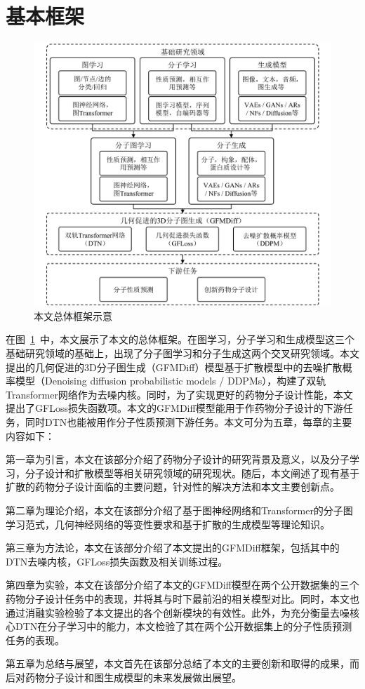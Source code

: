 \section{基本框架}
\begin{figure}[h]
    \centering
    \includegraphics[width=\linewidth]{figures/overall_structure.png}
    \caption{本文总体框架示意}
    \label{fig:oa_struc}
  \end{figure}

在图~\ref{fig:oa_struc}~中，本文展示了本文的总体框架。在图学习，分子学习和生成模型这三个基础研究领域的基础上，出现了分子图学习和分子生成这两个交叉研究领域。本文提出的几何促进的3D分子图生成（GFMDiff）模型基于扩散模型中的去噪扩散概率模型（Denoising diffusion probabilistic models / DDPMs），构建了双轨Transformer网络作为去噪内核。同时，为了实现更好的药物分子设计性能，本文提出了GFLoss损失函数项。本文的GFMDiff模型能用于作药物分子设计的下游任务，同时DTN也能被用作分子性质预测下游任务。本文可分为五章，每章的主要内容如下：

第一章为引言，本文在该部分介绍了药物分子设计的研究背景及意义，以及分子学习，分子设计和扩散模型等相关研究领域的研究现状。随后，本文阐述了现有基于扩散的药物分子设计面临的主要问题，针对性的解决方法和本文主要创新点。

第二章为理论介绍，本文在该部分介绍了基于图神经网络和Transformer的分子图学习范式，几何神经网络的等变性要求和基于扩散的生成模型等理论知识。

第三章为方法论，本文在该部分介绍了本文提出的GFMDiff框架，包括其中的DTN去噪内核，GFLoss损失函数及相关训练过程。

第四章为实验，本文在该部分介绍了本文的GFMDiff模型在两个公开数据集的三个药物分子设计任务中的表现，并将其与时下最前沿的相关模型对比。同时，本文也通过消融实验检验了本文提出的各个创新模块的有效性。此外，为充分衡量去噪核心DTN在分子学习中的能力，本文检验了其在两个公开数据集上的分子性质预测任务的表现。

第五章为总结与展望，本文首先在该部分总结了本文的主要创新和取得的成果，而后对药物分子设计和图生成模型的未来发展做出展望。